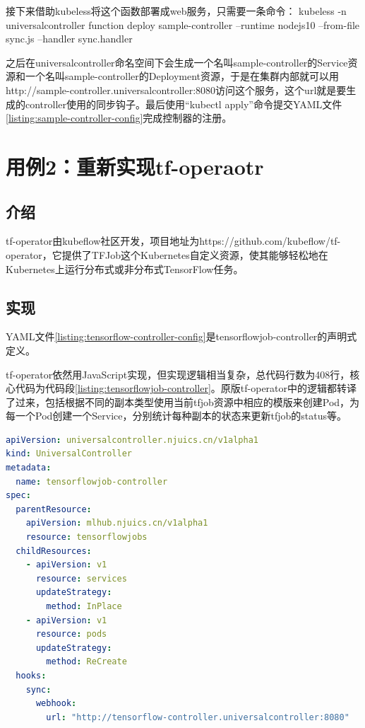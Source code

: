 \documentclass[macfonts,master]{njuthesis}
\begin{document}
接下来借助kubeless将这个函数部署成web服务，只需要一条命令：
kubeless -n universalcontroller function deploy sample-controller --runtime nodejs10 --from-file sync.js --handler sync.handler

之后在universalcontroller命名空间下会生成一个名叫sample-controller的Service资源和一个名叫sample-controller的Deployment资源，于是在集群内部就可以用http://sample-controller.universalcontroller:8080访问这个服务，这个url就是要生成的controller使用的同步钩子。最后使用``kubectl apply''命令提交YAML文件\ref{listing:sample-controller-config}完成控制器的注册。
\section{用例2：重新实现tf-operaotr}
\subsection{介绍}
tf-operator由kubeflow社区开发，项目地址为https://github.com/kubeflow/tf-operator，它提供了TFJob这个Kubernetes自定义资源，使其能够轻松地在Kubernetes上运行分布式或非分布式TensorFlow任务。
\subsection{实现}

YAML文件\ref{listing:tensorflow-controller-config}是tensorflowjob-controller的声明式定义。

tf-operator依然用JavaScript实现，但实现逻辑相当复杂，总代码行数为408行，核心代码为代码段\ref{listing:tensorflowjob-controller}。原版tf-operator中的逻辑都转译了过来，包括根据不同的副本类型使用当前tfjob资源中相应的模版来创建Pod，为每一个Pod创建一个Service，分别统计每种副本的状态来更新tfjob的status等。

\newpage
\begin{lstlisting}[language=yaml,caption=tensorflowjob-controller的配置文件,label=listing:tensorflow-controller-config]
apiVersion: universalcontroller.njuics.cn/v1alpha1
kind: UniversalController
metadata:
  name: tensorflowjob-controller
spec:
  parentResource:
    apiVersion: mlhub.njuics.cn/v1alpha1
    resource: tensorflowjobs
  childResources:
    - apiVersion: v1
      resource: services
      updateStrategy:
        method: InPlace
    - apiVersion: v1
      resource: pods
      updateStrategy:
        method: ReCreate
  hooks:
    sync:
      webhook:
        url: "http://tensorflow-controller.universalcontroller:8080"
\end{lstlisting}
\end{document}
